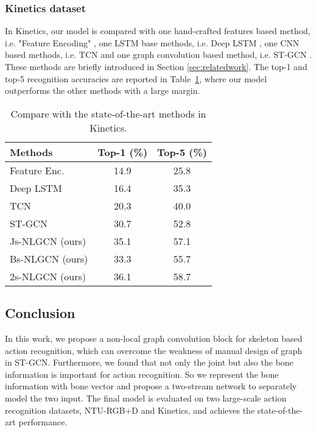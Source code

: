 \documentclass[10pt,twocolumn,letterpaper]{article}
\begin{document}
    \subsubsection{Kinetics dataset}
    In Kinetics, our model is compared with one hand-crafted features based method, i.e. "Feature Encoding" \cite{fernando_modeling_2015}, one LSTM base methods, i.e. Deep LSTM \cite{shahroudy_ntu_2016}, one CNN based methods, i.e. TCN \cite{kim_interpretable_2017} and one graph convolution based method, i.e. ST-GCN \cite{yan_spatial_2018}. These methods are briefly introduced in Section \ref{sec:relatedwork}. The top-1 and top-5 recognition accuracies are reported in Table~\ref{kinetics}, where our model outperforms the other methods with a large margin.
    
    \begin{table}[htb]
    \begin{center}
    \label{kinetics}
		\begin{tabular}{lcc}
			\hline
			Methods     & Top-1 (\%)& Top-5 (\%)    \\
			\hline
			Feature Enc. \cite{fernando_modeling_2015} & 14.9  &    25.8  \\
			Deep LSTM  \cite{shahroudy_ntu_2016}   & 16.4 &    35.3  \\
			TCN  \cite{kim_interpretable_2017}   & 20.3&    40.0      \\
            ST-GCN  \cite{yan_spatial_2018}  & 30.7 &      52.8  \\
            \hline
            Js-NLGCN (ours)& 35.1& 57.1\\
            Bs-NLGCN (ours)& 33.3& 55.7\\
            2s-NLGCN (ours)&  36.1& 58.7\\
			\hline
		\end{tabular}
    \end{center}
	\caption{Compare with the state-of-the-art methods in Kinetics.}
	\end{table}
   
	\subsection{Conclusion}
    In this work, we propose a non-local graph convolution block for skeleton based action recognition, which can overcome the weakness of manual design of graph in ST-GCN.
Furthermore, we found that not only the joint but also the bone information is important for action recognition. So we represent the bone information with bone vector and propose a two-stream network to separately model the two input. The final model is evaluated on two large-scale action recognition datasets, NTU-RGB+D and Kinetics, and achieves the state-of-the-art performance.


{\small


}
\end{document}
